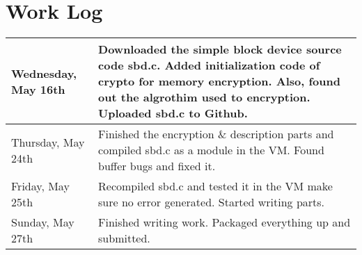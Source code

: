 \documentclass[10pt,draftclsnofoot,onecolumn]{IEEEtran}
\begin{document}
    \section{Work Log}
      \begin{center}
        \begin{tabular}{ | p{4cm} | p{10cm} | }
          \hline
          Wednesday, May 16th & Downloaded the simple block device source code sbd.c. Added initialization code of crypto for memory encryption. Also, found out the algrothim used to encryption. Uploaded sbd.c to Github. \\ \hline
          Thursday, May 24th & Finished the encryption \& description parts and compiled sbd.c as a module in the VM. Found buffer bugs and fixed it. \\ \hline
          Friday, May 25th & Recompiled sbd.c and tested it in the VM make sure no error generated. Started writing parts. \\ \hline
          Sunday, May 27th & Finished writing work. Packaged everything up and submitted. \\ \hline
        \end{tabular}
      \end{center}
\end{document}
